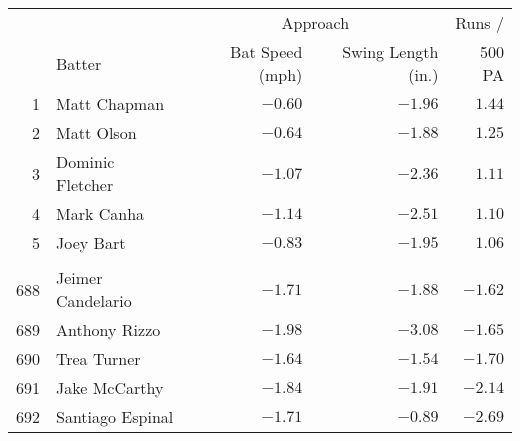 \begin{tabular}{rl|rr|r}
      &        & \multicolumn{2}{c|}{Approach}          & Runs /\\
      & Batter & Bat Speed (mph)  & Swing Length (in.)  & 500 PA\\
  \hline
    1 & Matt Chapman & $-0.60$ & $-1.96$ & $1.44$ \\ 
    2 & Matt Olson & $-0.64$ & $-1.88$ & $1.25$ \\ 
    3 & Dominic Fletcher & $-1.07$ & $-2.36$ & $1.11$ \\ 
    4 & Mark Canha & $-1.14$ & $-2.51$ & $1.10$ \\ 
    5 & Joey Bart & $-0.83$ & $-1.95$ & $1.06$ \\ 
   &  &  &  &  \\ 
  688 & Jeimer Candelario & $-1.71$ & $-1.88$ & $-1.62$ \\ 
  689 & Anthony Rizzo & $-1.98$ & $-3.08$ & $-1.65$ \\ 
  690 & Trea Turner & $-1.64$ & $-1.54$ & $-1.70$ \\ 
  691 & Jake McCarthy & $-1.84$ & $-1.91$ & $-2.14$ \\ 
  692 & Santiago Espinal & $-1.71$ & $-0.89$ & $-2.69$ 
\end{tabular}